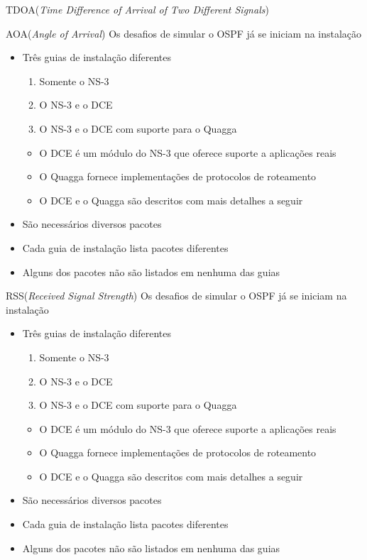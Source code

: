 \documentclass{beamer}
\newlength{\wideitemsep}
\let\olditem\item
\renewcommand{\item}{\setlength{\itemsep}{\wideitemsep}\olditem}
\begin{document}
\begin{frame}{TDOA(\textit{Time Difference of Arrival of Two Different Signals})}

\end{frame}


\begin{frame}{AOA(\textit{Angle of Arrival})}
Os desafios de simular o OSPF já se iniciam na instalação
\begin{itemize}
 \item Três guias de instalação diferentes %
  \begin{enumerate}
   \olditem Somente o NS-3 %
   \olditem O NS-3 e o DCE %
   \olditem O NS-3 e o DCE com suporte para o Quagga %
  \end{enumerate}
  \begin{itemize}
   \olditem O DCE é um módulo do NS-3 que oferece suporte a aplicações reais %
   \olditem O Quagga fornece implementações de protocolos de roteamento %
   \olditem O DCE e o Quagga são descritos com mais detalhes a seguir %
  \end{itemize}
 \item São necessários diversos pacotes %
 \item Cada guia de instalação lista pacotes diferentes %
 \item Alguns dos pacotes não são listados em nenhuma das guias %
\end{itemize}
\end{frame}

\begin{frame}{RSS(\textit{Received Signal Strength})}
Os desafios de simular o OSPF já se iniciam na instalação
\begin{itemize}
 \item Três guias de instalação diferentes %
  \begin{enumerate}
   \olditem Somente o NS-3 %
   \olditem O NS-3 e o DCE %
   \olditem O NS-3 e o DCE com suporte para o Quagga %
  \end{enumerate}
  \begin{itemize}
   \olditem O DCE é um módulo do NS-3 que oferece suporte a aplicações reais %
   \olditem O Quagga fornece implementações de protocolos de roteamento %
   \olditem O DCE e o Quagga são descritos com mais detalhes a seguir %
  \end{itemize}
 \item São necessários diversos pacotes %
 \item Cada guia de instalação lista pacotes diferentes %
 \item Alguns dos pacotes não são listados em nenhuma das guias %
\end{itemize}
\end{frame}
\end{document}
